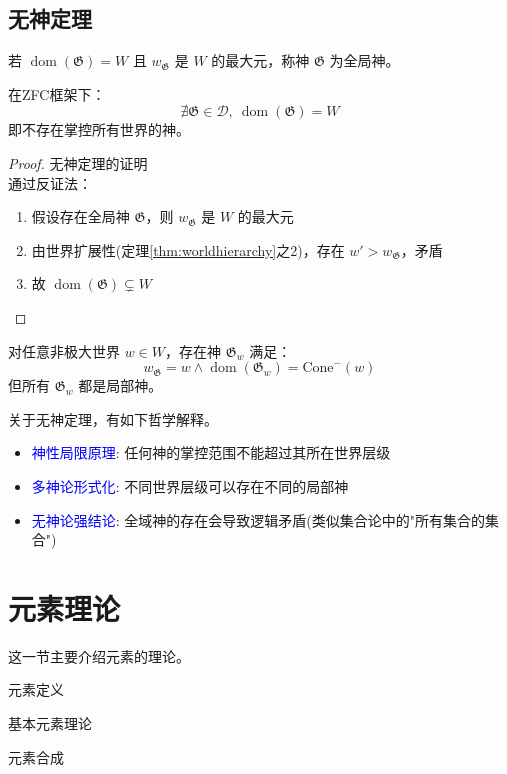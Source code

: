 \documentclass[lang=cn,newtx,10pt,scheme=chinese]{elegantbook}
\newcommand{\dom}{\mathop{\mathrm{dom}}} %
\newcommand{\Divine}{\mathcal{D}} %
\newcommand{\G}{\mathfrak{G}} %
\begin{document}
\subsection{无神定理}

\begin{definition}[全局神]
    若 $\dom(\G) = W$ 且 $w_\G$ 是 $W$ 的最大元，称神 $\G$ 为全局神。
\end{definition}

\begin{theorem}[无神定理]
    在ZFC框架下：
    \[
        \nexists \G \in \Divine,\ \dom(\G) = W
    \]
    即不存在掌控所有世界的神。
\end{theorem}

\begin{proof}{无神定理的证明}\\
    通过反证法：
    \begin{enumerate}
        \item 假设存在全局神 $\G$，则 $w_\G$ 是 $W$ 的最大元
        \item 由世界扩展性(定理\ref{thm:worldhierarchy}之2)，存在 $w' > w_\G$，矛盾
        \item 故 $\dom(\G) \subsetneq W$
    \end{enumerate}
\end{proof}

\begin{corollary}[相对有神性]
    对任意非极大世界 $w \in W$，存在神 $\G_w$ 满足：
    \[
        w_\G = w \land \dom(\G_w) = \mathrm{Cone}^-(w)
    \]
    但所有 $\G_w$ 都是局部神。
\end{corollary}

关于无神定理，有如下哲学解释。
\begin{itemize}
    \item \textcolor{blue}{神性局限原理}: 任何神的掌控范围不能超过其所在世界层级
    \item \textcolor{blue}{多神论形式化}: 不同世界层级可以存在不同的局部神
    \item \textcolor{blue}{无神论强结论}: 全域神的存在会导致逻辑矛盾(类似集合论中的"所有集合的集合")
\end{itemize}


\section{元素理论}
这一节主要介绍元素的理论。
\begin{introduction}
    \item 元素定义
    \item 基本元素理论
    \item 元素合成
\end{introduction}
\end{document}
